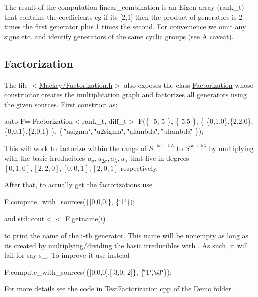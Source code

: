 The result of the computation {\ttfamily linear\+\_\+combination} is an Eigen array ({\ttfamily rank\+\_\+t}) that contains the coefficients eg if it\textquotesingle{}s {\ttfamily \mbox{[}2,1\mbox{]}} then the product of generators is 2 times the first generator plus 1 times the second. For convenience we omit any signs etc. and identify generators of the same cyclic groups (see \hyperlink{math_caveat}{A caveat}).\hypertarget{use_step1fact}{}\subsection{Factorization}\label{use_step1fact}
The file {\ttfamily $<$\hyperlink{Factorization_8h}{Mackey/\+Factorization.\+h}$>$} also exposes the class \hyperlink{classMackey_1_1Factorization}{Factorization} whose constructor creates the multiplication graph and factorizes all generators using the given sources. First construct as\+:

{\ttfamily auto F= Factorization$<$rank\+\_\+t, diff\+\_\+t$>$ F(\{ -\/5,-\/5 \}, \{ 5,5 \}, \{ \{0,1,0\},\{2,2,0\},\{0,0,1\},\{2,0,1\} \}, \{ \char`\"{}asigma\char`\"{}, \char`\"{}u2sigma\char`\"{}, \char`\"{}alambda\char`\"{}, \char`\"{}ulambda\char`\"{} \});}

This will work to factorize within the range of $S^{-5\sigma-5\lambda}$ to $S^{5\sigma+5\lambda}$ by multiplying with the basic irreducibles $ a_{\sigma}, u_{2\sigma}, a_{\lambda}, u_{\lambda}$ that live in degrees $[0,1,0],[2,2,0],[0,0,1],[2,0,1]$ respectively.

After that, to actually get the factorizations use

{\ttfamily F.\+compute\+\_\+with\+\_\+sources(\{\mbox{[}0,0,0\mbox{]}\}, \{\char`\"{}1\char`\"{}\});}

and {\ttfamily std\+::cout$<$$<$ F.\+getname(i) }

to print the name of the {\ttfamily i}-\/th generator. This name will be nonempty as long as it\textquotesingle{}s created by multiplying/dividing the basic irreducibles with {}. As such, it will fail for say {\ttfamily s\+\_}. To improve it use instead

{\ttfamily F.\+compute\+\_\+with\+\_\+sources(\{\mbox{[}0,0,0\mbox{]},\mbox{[}-\/3,0,-\/2\mbox{]}\}, \{\char`\"{}1\char`\"{},\char`\"{}s3\char`\"{}\});}

For more details see the code in Test\+Factorization.\+cpp of the Demo folder... 